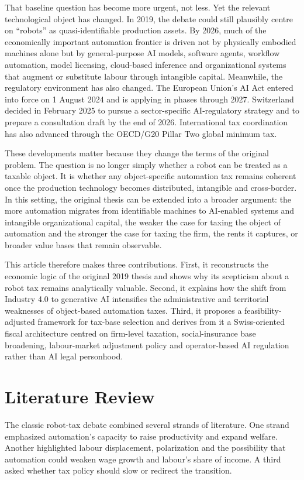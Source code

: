 \documentclass[11pt]{article}
\begin{document}
That baseline question has become more urgent, not less. Yet the relevant technological object has changed. In 2019, the debate could still plausibly centre on ``robots'' as quasi-identifiable production assets. By 2026, much of the economically important automation frontier is driven not by physically embodied machines alone but by general-purpose AI models, software agents, workflow automation, model licensing, cloud-based inference and organizational systems that augment or substitute labour through intangible capital. Meanwhile, the regulatory environment has also changed. The European Union's AI Act entered into force on 1 August 2024 and is applying in phases through 2027. Switzerland decided in February 2025 to pursue a sector-specific AI-regulatory strategy and to prepare a consultation draft by the end of 2026. International tax coordination has also advanced through the OECD/G20 Pillar Two global minimum tax.

These developments matter because they change the terms of the original problem. The question is no longer simply whether a robot can be treated as a taxable object. It is whether any object-specific automation tax remains coherent once the production technology becomes distributed, intangible and cross-border. In this setting, the original thesis can be extended into a broader argument: the more automation migrates from identifiable machines to AI-enabled systems and intangible organizational capital, the weaker the case for taxing the object of automation and the stronger the case for taxing the firm, the rents it captures, or broader value bases that remain observable.

This article therefore makes three contributions. First, it reconstructs the economic logic of the original 2019 thesis and shows why its scepticism about a robot tax remains analytically valuable. Second, it explains how the shift from Industry 4.0 to generative AI intensifies the administrative and territorial weaknesses of object-based automation taxes. Third, it proposes a feasibility-adjusted framework for tax-base selection and derives from it a Swiss-oriented fiscal architecture centred on firm-level taxation, social-insurance base broadening, labour-market adjustment policy and operator-based AI regulation rather than AI legal personhood.

\section{Literature Review}
The classic robot-tax debate combined several strands of literature. One strand emphasized automation's capacity to raise productivity and expand welfare. Another highlighted labour displacement, polarization and the possibility that automation could weaken wage growth and labour's share of income. A third asked whether tax policy should slow or redirect the transition.
\end{document}
